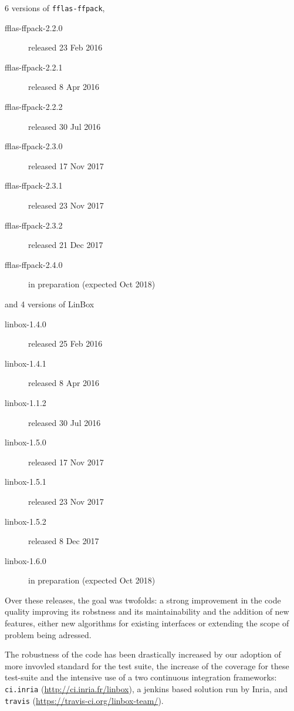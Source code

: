 \documentclass{deliverablereport}
\begin{document}
6 versions of \texttt{fflas-ffpack},
\begin{description}
  \item[fflas-ffpack-2.2.0] released 23 Feb 2016
  \item[fflas-ffpack-2.2.1] released 8 Apr 2016
  \item[fflas-ffpack-2.2.2] released 30 Jul 2016
  \item[fflas-ffpack-2.3.0] released 17 Nov 2017
  \item[fflas-ffpack-2.3.1] released 23 Nov 2017
  \item[fflas-ffpack-2.3.2] released 21 Dec 2017
  \item[fflas-ffpack-2.4.0] in preparation (expected Oct 2018)
\end{description}
and 4 versions of LinBox
\begin{description}
  \item[linbox-1.4.0] released 25 Feb 2016
  \item[linbox-1.4.1] released 8 Apr 2016
  \item[linbox-1.1.2] released 30 Jul 2016
  \item[linbox-1.5.0] released 17 Nov 2017
  \item[linbox-1.5.1] released 23 Nov 2017
  \item[linbox-1.5.2] released 8 Dec 2017
  \item[linbox-1.6.0] in preparation (expected Oct 2018)
\end{description}

Over these releases, the goal was twofolds: a strong improvement in the code
quality improving its robstness and its maintainability and  the addition of new
features, either new algorithms for existing interfaces or extending the scope
of problem being adressed.

The robustness of the code has been drastically increased by our adoption of more
invovled standard for the test suite, the increase of the coverage for these
test-suite and the intensive use of a two continuous integration frameworks:
\texttt{ci.inria} (\url{http://ci.inria.fr/linbox}), a jenkins based solution run by Inria, and
\texttt{travis} (\url{https://travis-ci.org/linbox-team/}).
\end{document}
